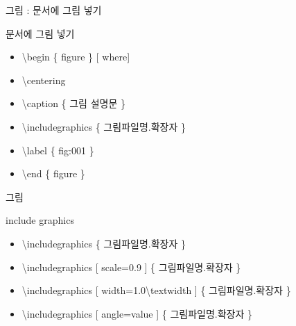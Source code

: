 \documentclass[ aspectratio=149,  10pt,blue,xcolor=pdftex,dvipsnames,table,handout,notes]{beamer}
\begin{document}

		\begin{frame}[plain]
		\centering
		\scalebox{10}{그림}

		\note[item]{}
		\end{frame}


		\begin{frame}[t]{그림 : 문서에 그림 넣기}

			\begin{block} {문서에 그림 넣기}
			\begin{itemize}
			\item[]	\textbackslash begin \{ figure \} [ where] 
			\item[]	\textbackslash centering
			\item[]	\textbackslash  caption \{ 그림 설명문 \}
			\item[]	\textbackslash  includegraphics \{ 그림파일명.확장자 \}
			\item[]	\textbackslash  label \{ fig:001 \}
			\item[]	\textbackslash end \{ figure \}
			\end{itemize}
			\end{block}

		\end{frame}




		\begin{frame}[t]{그림}

			\begin{block} {include graphics}
			\begin{itemize}
			\item[]	\textbackslash  includegraphics \{ 그림파일명.확장자 \}
			\item[]	\textbackslash  includegraphics [ scale=0.9 ] \{ 그림파일명.확장자 \}
			\item[]	\textbackslash  includegraphics [ width=1.0\textbackslash textwidth ] \{ 그림파일명.확장자 \}
			\item[]	\textbackslash  includegraphics [ angle=value ] \{ 그림파일명.확장자 \}
			\end{itemize}
			\end{block}

		\end{frame}
\end{document}

